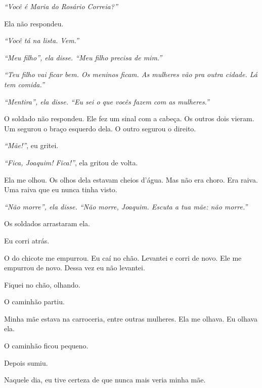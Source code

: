 \noindent \textit{\textquotedblleft{}Você é Maria do Rosário Correia?\textquotedblright{}}

\noindent Ela não respondeu.

\noindent \textit{\textquotedblleft{}Você tá na lista. Vem.\textquotedblright{}}

\noindent \textit{\textquotedblleft{}Meu filho\textquotedblright{}\textit{, ela disse. }\textquotedblleft{}Meu filho precisa de mim.\textquotedblright{}}

\noindent \textit{\textquotedblleft{}Teu filho vai ficar bem. Os meninos ficam. As mulheres vão pra outra cidade. Lá tem comida.\textquotedblright{}}

\noindent \textit{\textquotedblleft{}Mentira\textquotedblright{}\textit{, ela disse. }\textquotedblleft{}Eu sei o que vocês fazem com as mulheres.\textquotedblright{}}

\noindent O soldado não respondeu. Ele fez um sinal com a cabeça. Os outros dois vieram. Um segurou o braço esquerdo dela. O outro segurou o direito.

\noindent \textit{\textquotedblleft{}Mãe!\textquotedblright{}}, eu gritei.

\noindent \textit{\textquotedblleft{}Fica, Joaquim! Fica!\textquotedblright{}}, ela gritou de volta.

\noindent Ela me olhou. Os olhos dela estavam cheios d'água. Mas não era choro. Era raiva. Uma raiva que eu nunca tinha visto.

\noindent \textit{\textquotedblleft{}Não morre\textquotedblright{}\textit{, ela disse. }\textquotedblleft{}Não morre, Joaquim. Escuta a tua mãe: não morre.\textquotedblright{}}

\noindent Os soldados arrastaram ela.

\noindent Eu corri atrás.

\noindent O do chicote me empurrou. Eu caí no chão. Levantei e corri de novo. Ele me empurrou de novo. Dessa vez eu não levantei.

\noindent Fiquei no chão, olhando.

\noindent O caminhão partiu.

\noindent Minha mãe estava na carroceria, entre outras mulheres. Ela me olhava. Eu olhava ela.

\noindent O caminhão ficou pequeno.

\noindent Depois sumiu.

\noindent Naquele dia, eu tive certeza de que nunca mais veria minha mãe.

